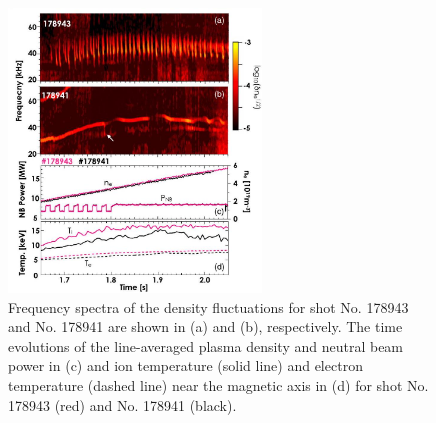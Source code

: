\documentclass[oneside,onecolumn]{article}
\begin{document}
\begin{sloppypar}
  \begin{figure}[htbp]
  	\centering
  	\includegraphics[max width=0.6\textwidth,max height=1.0\textheight]{2023_06_19_f8dbb752866ca158c73eg-2(1)}
  	\caption{Frequency spectra of the density fluctuations for shot No. 178943 and No. 178941 are shown in (a) and (b), respectively. The time evolutions of the line-averaged plasma density and neutral beam power in (c) and ion temperature (solid line) and electron temperature (dashed line) near the magnetic axis in (d) for shot No. 178943 (red) and No. 178941 (black).}
  	\label{figure1}
  \end{figure}
  

\end{sloppypar}
\end{document}
